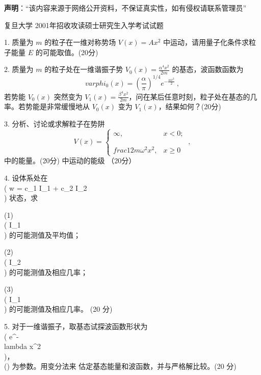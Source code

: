 
\textbf{声明}：“该内容来源于网络公开资料，不保证真实性，如有侵权请联系管理员”

复旦大学 2001年招收攻读硕士研究生入学考试试题

1. 质量为 $m$ 的粒子在一维对称势场 $V(x) = Ax^2$ 中运动，请用量子化条件求粒子能量 $E$ 的可能取值。(20分)

2. 质量为 $m$ 的粒子处在一维谐振子势 $V_0(x) = \frac{\alpha^4 x^2}{2m}$ 的基态，波函数函数为
$$ varphi_0(x) = \left(\frac{\alpha}{\pi}\right)^{1/4} e^{-\frac{\alpha x^2}{2}}~,$$ 
若势能 $V_0(x)$ 突然变为 $V_1(x) = \frac{\beta^4 x^2}{2m}$，问在某后任意时刻，粒子处在基态的几率。若势能是非常缓慢地从 $V_0(x)$ 变为 $V_1(x)$，结果如何？(20分)

3. 分析、讨论或求解粒子在势阱
$$  V(x) = \begin{cases} \infty, & x < 0; \\\\ \\frac{1}{2} m \omega^2 x^2, & x \geq 0 \end{cases}~,$$ 
中的能量。(20分)
中运动的能级 （20分）

4. 设体系处在 \\( w = c_1 I_1 + c_2 I_2 \\) 状态，求

(1) \\( I_1 \\) 的可能测值及平均值；

(2) \\( I_2 \\) 的可能测值及相应几率；

(3) \\( I_1 \\) 的可能测值及相应几率。 (20 分)

5. 对于一维谐振子，取基态试探波函数形状为 \\( e^{-\\lambda x^2} \\)，\\(\lambda) 为参数。用变分法来
    估定基态能量和波函数，并与严格解比较。(20 分)
    
